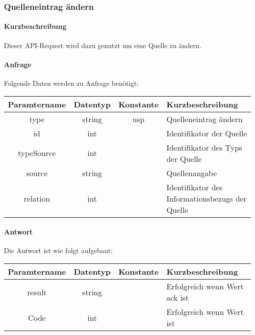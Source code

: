 \subsubsection{Quelleneintrag ändern}
\paragraph{Kurzbeschreibung}Dieser API-Request wird dazu genutzt um eine Quelle zu ändern.
\paragraph{Anfrage}Folgende Daten werden zu Anfrage benötigt:
\begin{table}[H]
	\begin{tabular}{|c|c|c|p{6.5cm}|}
		\hline
		\textbf{Paramtername} & \textbf{Datentyp} & \textbf{Konstante} & \textbf{Kurzbeschreibung}                                                                                               \\ \hline
		type                & string            & usp                & Quelleneintrag ändern \\ \hline
		id                  & int               &                    & Identifikator der Quelle \\ \hline
		typeSource          & int               &                    & Identifikator des Typs der Quelle \\ \hline
		source              & string            &                    & Quellenangabe \\ \hline
		relation            & int               &                    & Identifikator des Informationsbezugs der Quelle \\ \hline
	\end{tabular}
\end{table}
\paragraph{Antwort}Die Antwort ist wie folgt aufgebaut:
\begin{table}[H]
	\begin{tabular}{|c|c|c|p{6.5cm}|}
		\hline
		\textbf{Paramtername} & \textbf{Datentyp} & \textbf{Konstante} & \textbf{Kurzbeschreibung}                                                                                               \\ \hline
		result              & string           &                 & Erfolgreich wenn Wert {\glqq ack\grqq} ist \\ \hline
		Code                & int              &                 & Erfolgreich wenn Wert {\glqq 0\grqq} ist \\ \hline
	\end{tabular}
\end{table}
